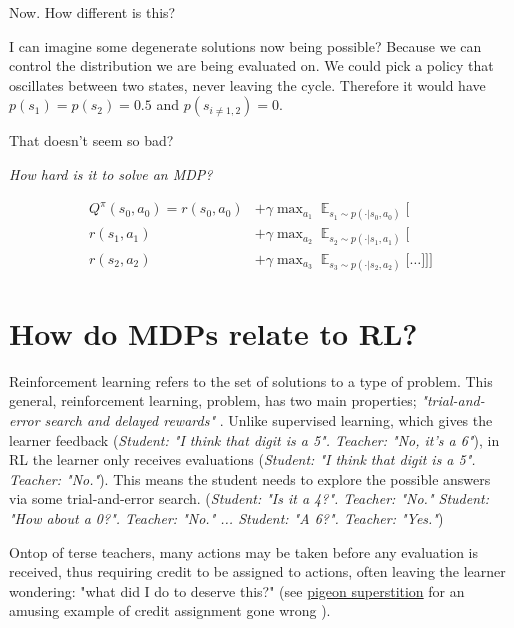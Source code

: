 Now. How different is this?

I can imagine some degenerate solutions now being possible? Because we
can control the distribution we are being evaluated on. We could pick a
policy that oscillates between two states, never leaving the cycle.
Therefore it would have \(p(s_1) = p(s_2) = 0.5\) and
\(p(s_{i \neq 1,2}) = 0\).

That doesn't seem so bad?

\begin{displayquote}
  \textit{How hard is it to solve an MDP?}
\end{displayquote}


\begin{align*}
Q^{\pi}(s_0, a_0) = r(s_0, a_0) &+ \gamma \mathop{\text{max}}_{a_1} \mathop{\mathbb E}_{s_1\sim p(\cdot | s_0, a_0)} \Bigg[ \\
r(s_1, a_1)  &+ \gamma \mathop{\text{max}}_{a_2} \mathop{\mathbb E}_{s_2\sim p(\cdot | s_1, a_1)} \bigg[\\
r(s_2, a_2)  &+ \gamma \mathop{\text{max}}_{a_3} \mathop{\mathbb E}_{s_3\sim p(\cdot | s_2, a_2)} \Big[
\dots \Big] \bigg] \Bigg]
\end{align*}

\hypertarget{how-do-mdps-relate-to-rl}{%
\section{How do MDPs relate to RL?}\label{how-do-mdps-relate-to-rl}}

Reinforcement learning refers to the set of solutions to a type of problem.
This general, reinforcement learning, problem, has two main properties;
\textit{"trial-and-error search and delayed rewards"} \cite{Sutton2018}.
Unlike supervised learning, which gives the learner feedback (\textit{Student: "I think that digit
is a 5". Teacher: "No, it's a 6"}), in RL the learner only receives evaluations (\textit{Student: "I think
that digit is a 5". Teacher: "No."}). This means the student needs to explore the possible answers via some trial-and-error search.
(\textit{Student: "Is it a 4?". Teacher: "No." Student: "How about a 0?". Teacher: "No." ... Student: "A 6?". Teacher: "Yes."})

Ontop of terse teachers, many actions may be taken
before any evaluation is received, thus requiring credit to be assigned to actions,
often leaving the learner wondering: "what did I do to deserve this?" (see
\href{https://www.youtube.com/watch?v=Qv4H81gEGDQ}{pigeon superstition} for an amusing
example of credit assignment gone wrong \cite{Box1997}).

